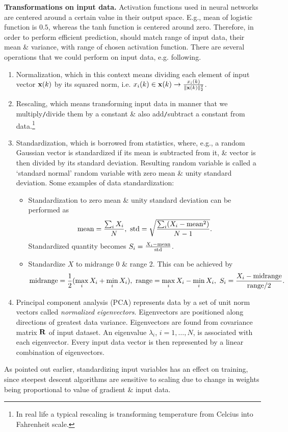 \documentclass{article}
\begin{document}
\begin{enumerate}
\begin{itemize}
\begin{itemize}
\begin{itemize}
				{\bf Transformations on input data.} Activation functions used in neural networks are centered around a certain value in their output space. E.g., mean of logistic function is $0.5$, whereas the tanh function is centered around zero. Therefore, in order to perform efficient prediction, should match range of input data, their mean \& variance, with range of chosen activation function. There are several operations that we could perform on input data, e.g. following.
				\begin{enumerate}
					\item Normalization, which in this context means dividing each element of input vector ${\bf x}(k)$ by its squared norm, i.e. $x_i(k)\in{\bf x}(k)\to\frac{x_i(k)}{\|{\bf x}(k)\|_2^2}$.
					\item Rescaling, which means transforming input data in manner that we multiply{\tt/}divide them by a constant \& also add{\tt/}subtract a constant from data.\footnote{In real life a typical rescaling is transforming temperature from Celcius into Fahrenheit scale.}
					\item Standardization, which is borrowed from statistics, where, e.g., a random Gaussian vector is standardized if its mean is subtracted from it, \& vector is then divided by its standard deviation. Resulting random variable is called a `standard normal' random variable with zero mean \& unity standard deviation. Some examples of data standardization:
					\begin{itemize}
						\item Standardization to zero mean \& unity standard deviation can be performed as
						\begin{equation}
							{\rm mean} = \frac{\sum_i X_i}{N},\ {\rm std} = \sqrt{\frac{\sum_i (X_i - {\rm mean}^2)}{N - 1}}.
						\end{equation}
						Standardized quantity becomes $S_i = \frac{X_i - {\rm mean}}{{\rm std}}$.
						\item Standardize $X$ to midrange 0 \& range 2. This can be achieved by
						\begin{equation}
							{\rm midrange} = \frac{1}{2}(\max_i X_i + \min_i X_i),\ {\rm range} = \max_i X_i - \min_i X_i,\ S_i = \frac{X_i - {\rm midrange}}{{\rm range}/2}.
						\end{equation}
					\end{itemize}
					\item Principal component analysis (PCA) represents data by a set of unit norm vectors called {\it normalized eigenvectors}. Eigenvectors are positioned along directions of greatest data variance. Eigenvectors are found from covariance matrix ${\bf R}$ of input dataset. An eigenvalue $\lambda_i$, $i = 1,\ldots,N$, is associated with each eigenvector. Every input data vector is then represented by a linear combination of eigenvectors.
				\end{enumerate}
				As pointed out earlier, standardizing input variables has an effect on training, since steepest descent algorithms are sensitive to scaling due to change in weights being proportional to value of gradient \& input data.
				

\end{itemize}
\end{itemize}
\end{itemize}
\end{enumerate}
\end{document}
